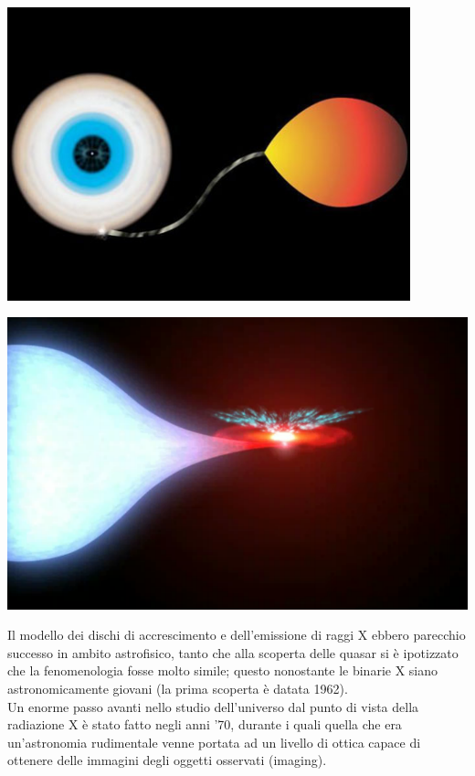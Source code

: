 \vspace{0,15cm}
\begin{minipage}{.45\textwidth}
	\centering
	\includegraphics[width=0.875\textwidth]{Img/lobo_roche.jpg}
\end{minipage}
\begin{minipage}{.45\textwidth}
	\centering
	\includegraphics[width=1\textwidth]{Img/binaria_x.png}
\end{minipage}

\vspace{0,15cm}

Il modello dei dischi di accrescimento e dell'emissione di raggi X ebbero parecchio successo in ambito astrofisico, tanto che alla scoperta delle quasar si è ipotizzato che la fenomenologia fosse molto simile; questo nonostante le binarie X siano astronomicamente giovani (la prima scoperta è datata 1962).
\\
Un enorme passo avanti nello studio dell'universo dal punto di vista della radiazione X è stato fatto negli anni '70, durante i quali quella che era un'astronomia rudimentale venne portata ad un livello di ottica capace di ottenere delle immagini degli oggetti osservati (imaging).
\\

